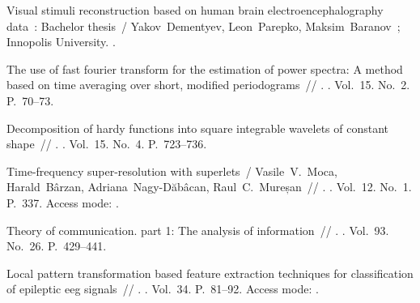 \expandafter\long\expandafter\gdef\csname fullcite@dementyev2025visualstimuli\endcsname{%
 Visual stimuli reconstruction
  based on human brain electroencephalography data~: Bachelor thesis~/
  Yakov~Dementyev, Leon~Parepko, Maksim~Baranov~; Innopolis University.
  \BibDash
{}.
}

\expandafter\long\expandafter\gdef\csname fullcite@10.1109/TAU.1967.1161901\endcsname{%
 The use of fast fourier transform for the estimation of
  power spectra: A method based on time averaging over short, modified
  periodograms~//
  \href{http://dx.doi.org/10.1109/TAU.1967.1161901}{}. \BibDash
{}. \BibDash
\newblock Vol.~15. No.~2. \BibDash
\newblock P.~70--73.
}

\expandafter\long\expandafter\gdef\csname fullcite@10.1137/0515056\endcsname{%
 Decomposition of hardy functions into square
  integrable wavelets of constant shape~//
  \href{http://dx.doi.org/10.1137/0515056}{}. \BibDash
{}. \BibDash
\newblock Vol.~15. No.~4. \BibDash
\newblock P.~723--736.
}

\expandafter\long\expandafter\gdef\csname fullcite@10.1038/s41467-020-20539-9\endcsname{%
Time-frequency super-resolution with superlets~/ Vasile~V.~Moca,
  Harald~Bârzan, Adriana~Nagy-Dăbâcan, Raul~C.~Mureșan~//
  \href{http://dx.doi.org/10.1038/s41467-020-20539-9}{}. \BibDash
{}. \BibDash
\newblock Vol.~12. No.~1. \BibDash
\newblock P.~337. \BibDash
\newblock Access mode: .
}

\expandafter\long\expandafter\gdef\csname fullcite@gabor1946theory\endcsname{%
 Theory of communication. part 1: The analysis of
  information~//
  \href{http://dx.doi.org/10.1049/ji-3-2.1946.0074}{}. \BibDash
{}. \BibDash
\newblock Vol.~93. No.~26. \BibDash
\newblock P.~429--441.
}

\expandafter\long\expandafter\gdef\csname fullcite@10.1016/j.bspc.2017.01.005\endcsname{%
 Local pattern transformation based feature
  extraction techniques for classification of epileptic eeg signals~//
  \href{http://dx.doi.org/10.1016/j.bspc.2017.01.005}{}. \BibDash
{}. \BibDash
\newblock Vol.~34. \BibDash
\newblock P.~81--92. \BibDash
\newblock Access mode: .
}

